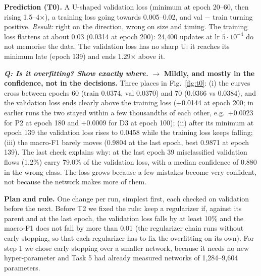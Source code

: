 \documentclass[9pt]{extarticle}
\newcommand{\Q}[1]{\textbf{\emph{Q: #1}}}
\newcommand{\run}[1]{\textsf{#1}}
\begin{document}
\textbf{Prediction (\run{T0}).} A U-shaped validation loss (minimum at epoch 20--60, then rising 1.5--4$\times$), a training loss going towards 0.005--0.02, and val $-$ train turning positive. \emph{Result:} right on the direction, wrong on size and timing. The training loss flattens at about 0.03 (0.0314 at epoch 200): 24,400 updates at lr $5\cdot10^{-4}$ do not memorise the data. The validation loss has no sharp U: it reaches its minimum late (epoch 139) and ends 1.29$\times$ above it.

\Q{Is it overfitting? Show exactly where.} $\rightarrow$ \textbf{Mildly, and mostly in the confidence, not in the decisions.} Three places in Fig.~\ref{fig:t0}: (i) the curves cross between epochs 60 (train 0.0374, val 0.0370) and 70 (0.0366 vs 0.0384), and the validation loss ends clearly above the training loss (+0.0144 at epoch 200; in earlier runs the two stayed within a few thousandths of each other, e.g.\ +0.0023 for \run{P2} at epoch 180 and +0.0009 for \run{D3} at epoch 100); (ii) after its minimum at epoch 139 the validation loss rises to 0.0458 while the training loss keeps falling; (iii) the macro-F1 barely moves (0.9804 at the last epoch, best 0.9871 at epoch 139). The last check explains why: at the last epoch 39 misclassified validation flows (1.2\%) carry 79.0\% of the validation loss, with a median confidence of 0.880 in the wrong class. The loss grows because a few mistakes become very confident, not because the network makes more of them.

\textbf{Plan and rule.} One change per run, simplest first, each checked on validation before the next. Before \run{T2} we fixed the rule: keep a regularizer if, against its parent and at the last epoch, the validation loss falls by at least 10\% and the macro-F1 does not fall by more than 0.01 (the regularizer chain runs without early stopping, so that each regularizer has to fix the overfitting on its own). For step 1 we chose early stopping over a smaller network, because it needs no new hyper-parameter and Task 5 had already measured networks of 1,284--9,604 parameters.
\end{document}
